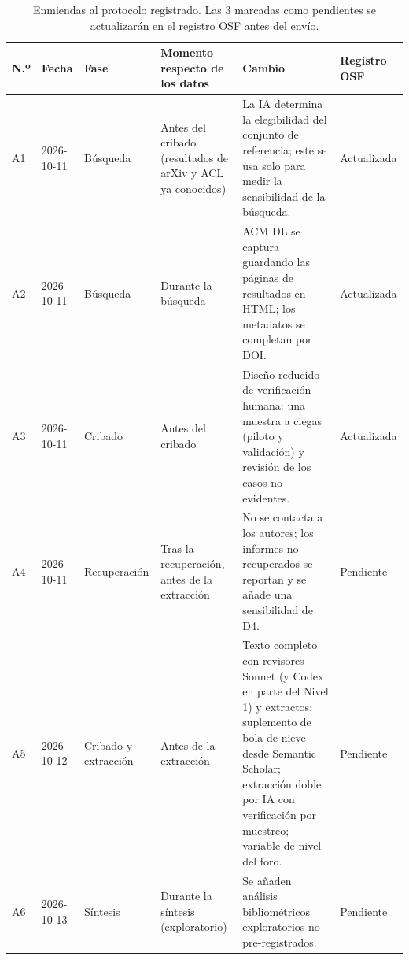 \begin{table}[!tbp]
\centering
\caption{Enmiendas al protocolo registrado. Las 3 marcadas como pendientes se actualizarán en el registro OSF antes del envío.}
\label{tab:enmiendas}
\footnotesize
\begin{tabularx}{\textwidth}{@{}l l l p{3.2cm} X l@{}}
\toprule
N.º & Fecha & Fase & Momento respecto de los datos & Cambio & Registro OSF \\
\midrule
A1 & 2026-10-11 & Búsqueda & Antes del cribado (resultados de arXiv y ACL ya conocidos) & La IA determina la elegibilidad del conjunto de referencia; este se usa solo para medir la sensibilidad de la búsqueda. & Actualizada \\
A2 & 2026-10-11 & Búsqueda & Durante la búsqueda & ACM DL se captura guardando las páginas de resultados en HTML; los metadatos se completan por DOI. & Actualizada \\
A3 & 2026-10-11 & Cribado & Antes del cribado & Diseño reducido de verificación humana: una muestra a ciegas (piloto y validación) y revisión de los casos no evidentes. & Actualizada \\
A4 & 2026-10-11 & Recuperación & Tras la recuperación, antes de la extracción & No se contacta a los autores; los informes no recuperados se reportan y se añade una sensibilidad de D4. & Pendiente \\
A5 & 2026-10-12 & Cribado y extracción & Antes de la extracción & Texto completo con revisores Sonnet (y Codex en parte del Nivel 1) y extractos; suplemento de bola de nieve desde Semantic Scholar; extracción doble por IA con verificación por muestreo; variable de nivel del foro. & Pendiente \\
A6 & 2026-10-13 & Síntesis & Durante la síntesis (exploratorio) & Se añaden análisis bibliométricos exploratorios no pre-registrados. & Pendiente \\
\bottomrule
\end{tabularx}
\end{table}

